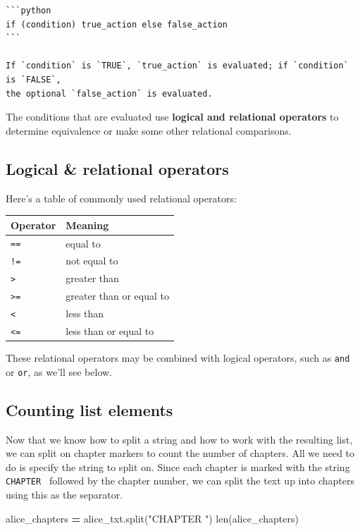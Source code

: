 \documentclass[
]{book}
\newenvironment{Shaded}{\begin{snugshade}}{\end{snugshade}}
\newcommand{\BuiltInTok}[1]{#1}
\newcommand{\NormalTok}[1]{#1}
\newcommand{\OperatorTok}[1]{\textcolor[rgb]{0.81,0.36,0.00}{\textbf{#1}}}
\newcommand{\StringTok}[1]{\textcolor[rgb]{0.31,0.60,0.02}{#1}}
\begin{document}
\begin{verbatim}
```python
if (condition) true_action else false_action
```

If `condition` is `TRUE`, `true_action` is evaluated; if `condition` is `FALSE`,
the optional `false_action` is evaluated.
\end{verbatim}

The conditions that are evaluated use \textbf{logical and relational operators} to determine equivalence or make some other relational comparisons.

\hypertarget{logical-relational-operators-1}{%
\subsection{Logical \& relational operators}\label{logical-relational-operators-1}}

Here's a table of commonly used relational operators:

\begin{longtable}[]{@{}ll@{}}
\toprule
Operator & Meaning\tabularnewline
\midrule
\endhead
\texttt{==} & equal to\tabularnewline
\texttt{!=} & not equal to\tabularnewline
\texttt{\textgreater{}} & greater than\tabularnewline
\texttt{\textgreater{}=} & greater than or equal to\tabularnewline
\texttt{\textless{}} & less than\tabularnewline
\texttt{\textless{}=} & less than or equal to\tabularnewline
\bottomrule
\end{longtable}

These relational operators may be combined with logical operators, such as \texttt{and} or \texttt{or}, as we'll see below.

\hypertarget{counting-list-elements}{%
\subsection{Counting list elements}\label{counting-list-elements}}

Now that we know how to split a string and how to work with the resulting list, we can split on chapter markers to count the number of chapters. All we need to do is specify the string to split on. Since each chapter is marked with the string \texttt{\textquotesingle{}CHAPTER\ \textquotesingle{}} followed by the chapter number, we can split the text up into chapters using this as the separator.

\begin{Shaded}
\begin{Highlighting}[]
\NormalTok{alice\_chapters }\OperatorTok{=}\NormalTok{ alice\_txt.split(}\StringTok{"CHAPTER "}\NormalTok{)}
\BuiltInTok{len}\NormalTok{(alice\_chapters)}
\end{Highlighting}
\end{Shaded}
\end{document}
